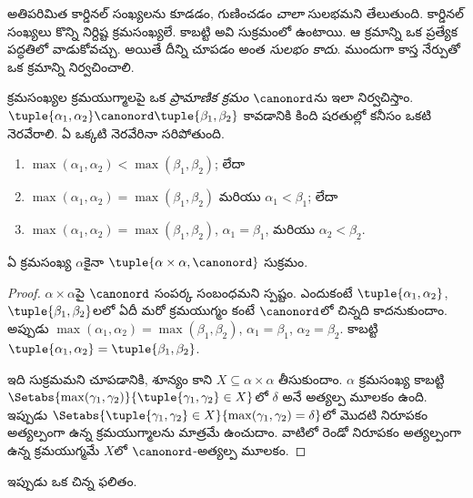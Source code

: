 \documentclass[../../../include/open-logic-section]{subfiles}
\begin{document}


అతిపరిమిత కార్డినల్ సంఖ్యలను కూడడం, గుణించడం
\emph{చాలా} సులభమని తేలుతుంది. కార్డినల్ సంఖ్యలు కొన్ని
నిర్దిష్ట క్రమసంఖ్యలే. కాబట్టి అవి సుక్రమంలో ఉంటాయి.
ఆ క్రమాన్ని ఒక ప్రత్యేక పద్ధతిలో వాడుకోవచ్చు. అయితే
దీన్ని చూపడం అంత \emph{సులభం కాదు}. ముందుగా కాస్త
నేర్పుతో ఒక క్రమాన్ని నిర్వచించాలి.

\begin{defn}
క్రమసంఖ్యల క్రమయుగ్మాలపై ఒక \emph{ప్రామాణిక క్రమం} $\canonord$ను ఇలా నిర్వచిస్తాం. $\tuple{\alpha_1, \alpha_2} \canonord
\tuple{\beta_1, \beta_2}$ కావడానికి కింది షరతుల్లో కనీసం ఒకటి నెరవేరాలి. ఏ ఒక్కటి నెరవేరినా సరిపోతుంది.
\begin{enumerate}
	\item $\max(\alpha_1, \alpha_2) < \max(\beta_1, \beta_2)$; లేదా
	\item $\max(\alpha_1, \alpha_2) = \max(\beta_1, \beta_2)$ మరియు $\alpha_1 < \beta_1$; లేదా
	\item $\max(\alpha_1, \alpha_2) = \max(\beta_1, \beta_2)$, $\alpha_1 = \beta_1$, మరియు $\alpha_2 < \beta_2$.
\end{enumerate}
\end{defn}

\begin{lem}
ఏ క్రమసంఖ్య $\alpha$కైనా $\tuple{\alpha \times \alpha, \canonord}$ సుక్రమం.
\end{lem}

\begin{proof}
$\alpha \times \alpha$పై $\canonord$ సంపర్క సంబంధమని స్పష్టం. ఎందుకంటే $\tuple{\alpha_1, \alpha_2}$, $\tuple{\beta_1,
\beta_2}$లలో ఏదీ మరో క్రమయుగ్మం కంటే $\canonord$లో చిన్నది కాదనుకుందాం. అప్పుడు $\max(\alpha_1,
\alpha_2) = \max(\beta_1, \beta_2)$, $\alpha_1 = \beta_1$, $\alpha_2 = \beta_2$. కాబట్టి $\tuple{\alpha_1, \alpha_2} =
\tuple{\beta_1,  \beta_2}$.

ఇది సుక్రమమని చూపడానికి, శూన్యం కాని
$X \subseteq \alpha\times\alpha$ తీసుకుందాం.
$\alpha$ క్రమసంఖ్య కాబట్టి $\Setabs{\max(\gamma_1, \gamma_2)}{\tuple{\gamma_1,
\gamma_2} \in X}$లో $\delta$ అనే అత్యల్ప మూలకం ఉంది.
ఇప్పుడు $\Setabs{\tuple{\gamma_1,\gamma_2} \in X}{\max(\gamma_1, \gamma_2) =
\delta}$లో మొదటి నిరూపకం అత్యల్పంగా ఉన్న
క్రమయుగ్మాలను మాత్రమే ఉంచుదాం. వాటిలో రెండో నిరూపకం
అత్యల్పంగా ఉన్న క్రమయుగ్మమే $X$లో $\canonord$-అత్యల్ప మూలకం.
\end{proof}
\noindent
ఇప్పుడు ఒక చిన్న ఫలితం.
\end{document}
